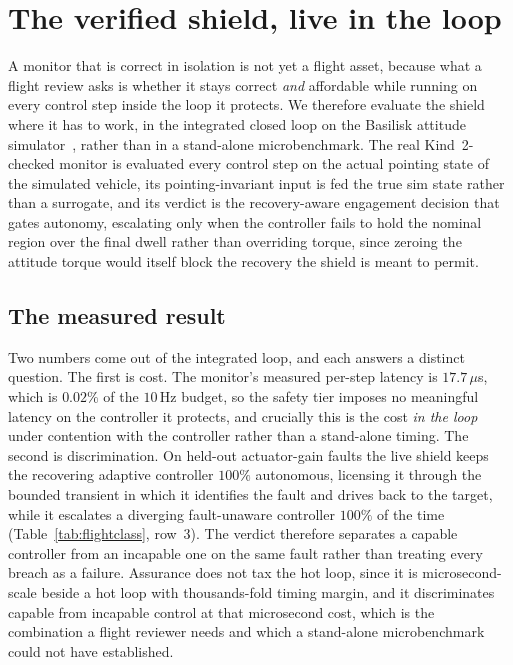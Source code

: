 \documentclass[11pt]{article}
\begin{document}
\section{The verified shield, live in the loop}
\label{sec:shield}
A monitor that is correct in isolation is not yet a flight asset, because what a flight review
asks is whether it stays correct \emph{and} affordable while running on every control step inside
the loop it protects. We therefore evaluate the shield where it has to work, in the integrated
closed loop on the Basilisk attitude simulator~\cite{Basilisk}, rather than in a stand-alone
microbenchmark. The real Kind~2-checked monitor is evaluated every control step on the actual
pointing state of the simulated vehicle, its pointing-invariant input is fed the true sim state
rather than a surrogate, and its verdict is the recovery-aware engagement decision that gates
autonomy, escalating only when the controller fails to hold the nominal region over the final
dwell rather than overriding torque, since zeroing the attitude torque would itself block the
recovery the shield is meant to permit.

\subsection{The measured result} Two numbers come out of the integrated loop, and each answers a
distinct question. The first is cost. The monitor's measured per-step latency is $17.7\,\mu$s,
which is $0.02\%$ of the $10$\,Hz budget, so the safety tier imposes no meaningful latency on the
controller it protects, and crucially this is the cost \emph{in the loop} under contention with
the controller rather than a stand-alone timing. The second is discrimination. On held-out
actuator-gain faults the live shield keeps the recovering adaptive controller $100\%$ autonomous,
licensing it through the bounded transient in which it identifies the fault and drives back to the
target, while it escalates a diverging fault-unaware controller $100\%$ of the time
(Table~\ref{tab:flightclass}, row~3). The verdict therefore separates a capable controller from an
incapable one on the same fault rather than treating every breach as a failure. Assurance does not
tax the hot loop, since it is microsecond-scale beside a hot loop with thousands-fold timing
margin, and it discriminates capable from incapable control at that microsecond cost, which is the
combination a flight reviewer needs and which a stand-alone microbenchmark could not have
established.
\end{document}
